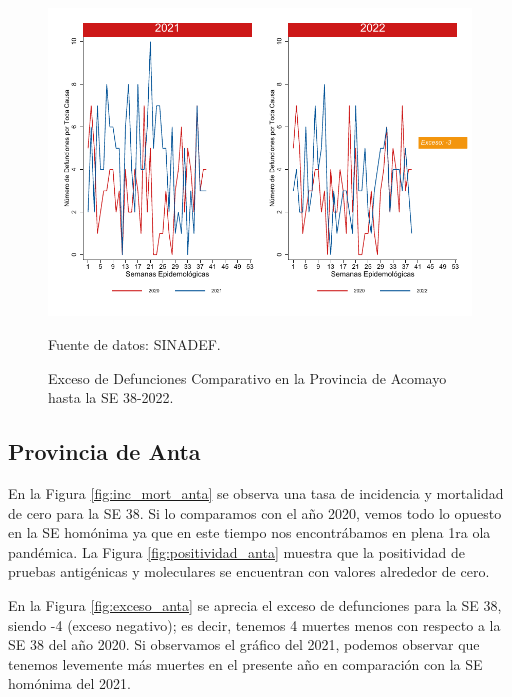 \documentclass[12pt,a4paper,openany]{book}
\begin{document}
	\begin{figure}[h]
		\caption{Exceso de Defunciones Comparativo en la Provincia de Acomayo hasta la SE 38-2022.}\label{fig:exceso_acomayo}
		\begin{center}
			\includegraphics[width=0.7\linewidth]{../figuras/exceso_1.pdf}
		\end{center}
		{\footnotesize {Fuente de datos: SINADEF.}}
	\end{figure}
	
	\clearpage
	
	\subsection*{Provincia de Anta}
	\noindent En la Figura \ref{fig:inc_mort_anta} se observa una tasa de incidencia y mortalidad de cero para la SE 38. Si lo comparamos con el año 2020, vemos todo lo opuesto en la SE homónima ya que en este tiempo nos encontrábamos en plena 1ra ola pandémica.
	\noindent La Figura
	\ref{fig:positividad_anta} muestra que la positividad de pruebas antigénicas y moleculares se encuentran con valores alrededor de cero.
	
	En la Figura \ref{fig:exceso_anta} se aprecia el exceso de defunciones para la SE 38, siendo -4 (exceso negativo); es decir, tenemos 4 muertes menos con respecto a la SE 38 del año 2020. Si observamos el gráfico del 2021, podemos observar que tenemos levemente más muertes en el presente año en comparación con la SE homónima del 2021.
	
\end{document}
